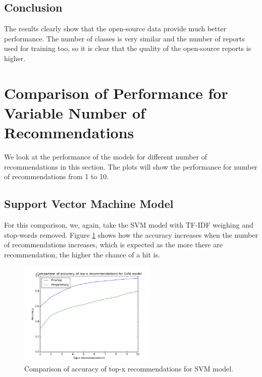 \subsection{Conclusion}

The results clearly show that the open-source data provide much better performance. The number of classes is very similar and the number of reports used for training too, so it is clear that the quality of the open-source reports is higher.

\section{Comparison of Performance for Variable Number of Recommendations}

We look at the performance of the models for different number of recommendations in this section. The plots will show the performance for number of recommendations from 1 to 10.

\subsection{Support Vector Machine Model}

For this comparison, we, again, take the SVM model with TF-IDF weighing and stop-words removed. Figure \ref{fig:results.topx.svm_accuracy} shows how the accuracy increases when the number of recommendations increases, which is expected as the more there are recommendation, the higher the chance of a hit is.

\begin{figure}[htbp]
    \centering
        \includegraphics[width=250px]{./images/top_x_comparison/svm_accuracy.png}
    \caption{Comparison of accuracy of top-x recommendations for SVM model.}
    \label{fig:results.topx.svm_accuracy}
\end{figure}

